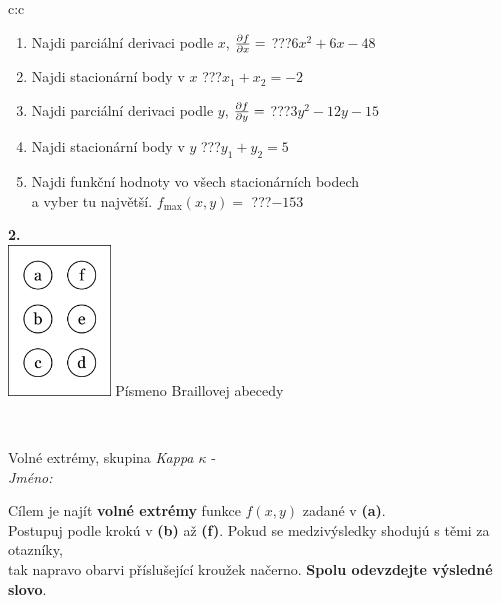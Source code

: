 \documentclass[10pt]{report}
\begin{document}
\begin{tabular}{c:c}
\begin{minipage}[c][104.5mm][t]{0.5\linewidth}
\begin{center}
\begin{minipage}{0.79\linewidth}
\begin{center}
\begin{varwidth}{\linewidth}
\begin{enumerate}
\item Najdi parciální derivaci podle $x$, $\pdv{f}{x}=$\quad \dotfill\; ???\;\dotfill \quad $6x^2+6x-48$
\item Najdi stacionární body v $x$\quad \dotfill\; ???\;\dotfill \quad $x_1+x_2=-2$
\item Najdi parciální derivaci podle $y$, $\pdv{f}{y}=$\quad \dotfill\; ???\;\dotfill \quad $3y^2-12y-15$
\item Najdi stacionární body v $y$\quad \dotfill\; ???\;\dotfill \quad $y_1+y_2=5$
\item Najdi funkční hodnoty vo všech stacionárních bodech \\ \phantom{xxxxxx} a vyber tu najvětší. $f_{\text{max}}(x,y)=$\quad \dotfill\; ???\;\dotfill \quad $-153$
\end{enumerate}
\end{varwidth}
\end{center}
\end{minipage}
\begin{minipage}{0.20\linewidth}
\begin{center}
{\Huge\bfseries 2.} \\[2mm]
\includegraphics[height=40mm]{../images/braille.png}
{\small Písmeno Braillovej abecedy}
\end{center}
\end{minipage}
\end{center}
\end{minipage}
\\ \hdashline
\begin{minipage}[c][104.5mm][t]{0.5\linewidth}
\begin{center}
\vspace{7mm}
{\huge Volné extrémy, skupina \textit{Kappa $\kappa$} -}\\[5mm]
\textit{Jméno:}\phantom{xxxxxxxxxxxxxxxxxxxxxxxxxxxxxxxxxxxxxxxxxxxxxxxxxxxxxxxxxxxxxxxxx}\\[5mm]
\begin{minipage}{0.95\linewidth}
\begin{center}
Cílem je najít \textbf{volné extrémy} funkce $f(x,y)$ zadané v \textbf{(a)}.\\Postupuj podle krokú v \textbf{(b)} až \textbf{(f)}. Pokud se medzivýsledky shodujú s těmi za otazníky,\\tak napravo obarvi příslušející kroužek načerno. \textbf{Spolu odevzdejte výsledné slovo}.

\end{center}
\end{minipage}
\end{center}
\end{minipage}
\end{tabular}
\end{document}
